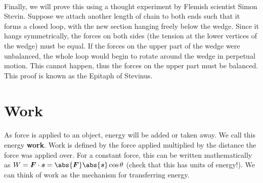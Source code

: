 \documentclass[../classical_mechanics.tex]{subfiles}
\begin{document}
\begin{example}
            \paragraph{}
            Finally, we will prove this using a thought experiment by Flemish scientist Simon Stevin.
            Suppose we attach another length of chain to both ends such that it forms a closed loop, with the new section hanging freely below the wedge.
            Since it hangs symmetrically, the forces on both sides (the tension at the lower vertices of the wedge) must be equal.
            If the forces on the upper part of the wedge were unbalanced, the whole loop would begin to rotate around the wedge in perpetual motion.
            This cannot happen, thus the forces on the upper part must be balanced.
            This proof is known as the Epitaph of Stevinus.
        \end{example}

    \section{Work}
        \paragraph{}
        As force is applied to an object, energy will be added or taken away.
        We call this energy \textbf{work}.
        Work is defined by the force applied multiplied by the distance the force was applied over.
        For a constant force, this can be written mathematically as $W=\vec{F}\cdot\vec{s}=\abs{\vec{F}}\abs{\vec{s}}\cos\theta$ (check that this has units of energy!).
        We can think of work as the mechanism for transferring energy.
        
\end{document}
